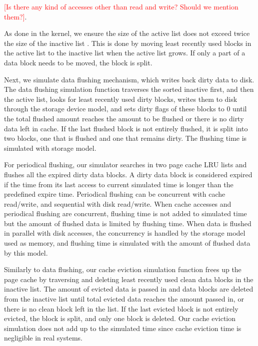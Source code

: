 \documentclass[conference]{IEEEtran}
\begin{document}
			\textcolor{red}{[Is there any kind of accesses other than read and write? 
			Should we mention them?]}. 			
			
            As done in the kernel, we ensure the size of the active list does not exceed twice the size of 
			the inactive list 
			\cite{gorman2004understanding, linuxdev3rd2010}. 
			This is done by moving least recently used blocks in the active list 
			to the inactive list when the active list grows. If only a part of a data 
			block needs to be moved, the block is split.

			Next, we simulate data flushing mechanism, which writes back 
			dirty data to disk. 
			The data flushing simulation function traverses the sorted inactive first, 
			and then the active list, looks for least recently used dirty blocks, 
			writes them to disk through the storage device model, and 
			sets dirty flags of these blocks to 0 until the total flushed amount 
			reaches the amount to be flushed or there is no dirty data left in cache. 
			If the last flushed block is not entirely flushed, it is split into 
			two blocks, one that is flushed and one that remains dirty.
			The flushing time is simulated with storage model.
			
			For periodical flushing, our simulator searches in two page cache 
			LRU lists and flushes all the expired dirty data blocks. 
			A dirty data block is considered expired if the time from its last access 
			to current simulated time is longer than the predefined expire time. 
			Periodical flushing can be concurrent with cache read/write, 
			and sequential with disk read/write. When cache accesses and 
			periodical flushing are concurrent, flushing time is not added to simulated 
			time but the amount of flushed data is limited by flushing time. 
			When data is flushed in parallel with disk accesses, the concurrency 
			is handled by the storage model used as memory, and flushing time 
			is simulated with the amount of flushed data by this model. 
				
			Similarly to data flushing, our cache eviction simulation function frees up 
			the page cache by traversing and deleting least recently used clean 
			data blocks in the inactive list.
			The amount of evicted data is passed in and data blocks are deleted 
			from the inactive list until total evicted data reaches the amount 
			passed in, or there is no clean block left in the list.
			If the last evicted block is not entirely evicted, the block is split, 
			and only one block is deleted.
			Our cache eviction simulation does not add up to the simulated time 
			since cache eviction time is negligible in real systems.			
\end{document}
